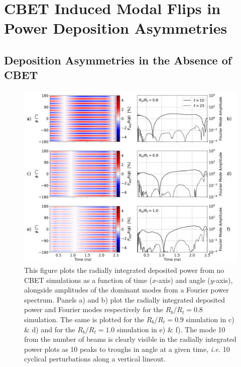 \section{CBET Induced Modal Flips in Power Deposition Asymmetries}%
\label{sec:Res1_PdepR_CBET_asymm}


\subsection{Deposition Asymmetries in the Absence of CBET}%
\label{sec:Res1_noCBET_asymmetries}

\begin{figure}[t!]
    \includegraphics[width=\linewidth]{Results1/Images/noCBET_PR_modes.png}
    \centering
    \caption{This figure plots the radially integrated deposited power from no \ac{CBET} simulations as a function of time ($x$-axis) and angle ($y$-axis), alongside amplitudes of the dominant modes from a Fourier power spectrum.
    Panels a) and b) plot the radially integrated deposited power and Fourier modes respectively for the $R_b/R_t=0.8$ simulation.
    The same is plotted for the $R_b/R_t=0.9$ simulation in c) \& d) and for the $R_b/R_t=1.0$ simulation in e) \& f).
    The mode 10 from the number of beams is clearly visible in the radially integrated power plots as 10 peaks to troughs in angle at a given time, \textit{i.e.} 10 cyclical perturbations along a vertical lineout.}%
    \label{fig:Res1_PR_noCBET_modes}
\end{figure}


